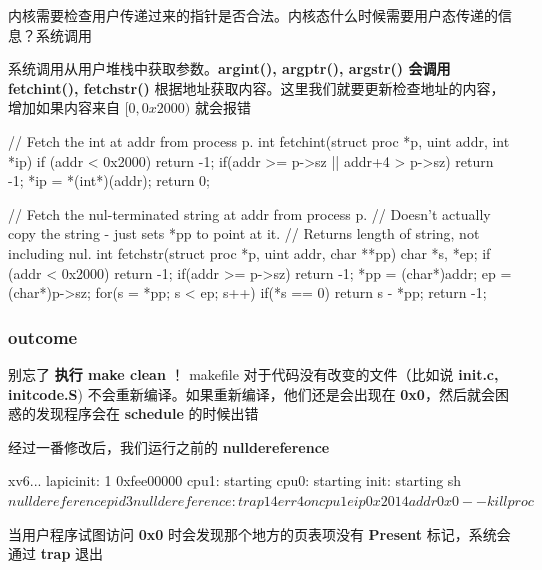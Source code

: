内核需要检查用户传递过来的指针是否合法。内核态什么时候需要用户态传递的信息？系统调用

系统调用从用户堆栈中获取参数。\textbf{argint(), argptr(), argstr() 会调用 fetchint(), fetchstr()} 根据地址获取内容。这里我们就要更新检查地址的内容，增加如果内容来自 $[0,0x2000)$ 就会报错

\begin{ccode}
    // Fetch the int at addr from process p.
    int
    fetchint(struct proc *p, uint addr, int *ip)
    {
        if (addr < 0x2000) return -1;
        if(addr >= p->sz || addr+4 > p->sz)
            return -1;
        *ip = *(int*)(addr);
        return 0;
    }

    // Fetch the nul-terminated string at addr from process p.
    // Doesn't actually copy the string - just sets *pp to point at it.
    // Returns length of string, not including nul.
    int
    fetchstr(struct proc *p, uint addr, char **pp)
    {
        char *s, *ep;
        if (addr < 0x2000) return -1;
        if(addr >= p->sz)
            return -1;
        *pp = (char*)addr;
        ep = (char*)p->sz;
        for(s = *pp; s < ep; s++)
            if(*s == 0)
            return s - *pp;
        return -1;
    }
\end{ccode}

\subsubsection{outcome}

别忘了 \textbf{执行 make clean} ！ makefile 对于代码没有改变的文件（比如说 \textbf{init.c, initcode.S}) 不会重新编译。如果重新编译，他们还是会出现在 \textbf{0x0}，然后就会困惑的发现程序会在 \textbf{schedule} 的时候出错 

经过一番修改后，我们运行之前的 \textbf{nulldereference}

\begin{textcode}
    xv6...
    lapicinit: 1 0xfee00000
    cpu1: starting
    cpu0: starting
    init: starting sh
    $ nulldereference
    pid 3 nulldereference: trap 14 err 4 on cpu 1 eip 0x2014 addr 0x0--kill proc
    $ 
\end{textcode}

当用户程序试图访问 \textbf{0x0} 时会发现那个地方的页表项没有 \textbf{Present} 标记，系统会通过 \textbf{trap} 退出